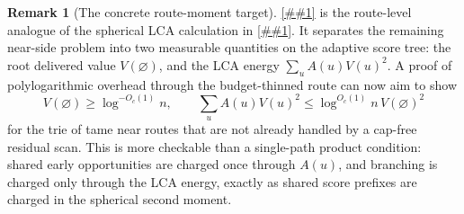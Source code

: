 \documentclass[10pt]{article}
\newcommand{\cref}[1]{\ref{##1}}
\newcommand{\Cref}[1]{\ref{##1}}
\theoremstyle{definition}
\newtheorem{remark}[theorem]{Remark}
\begin{document}
\begin{remark}[The concrete route-moment target]\label{rem:lca-value-target}
   \Cref{lem:lca-value-flow} is the route-level analogue of the spherical LCA
   calculation in \cref{lem:tame-second-moment}. It separates the remaining
   near-side problem into two measurable quantities on the adaptive score tree:
   the root delivered value $V(\varnothing)$, and the LCA energy
   $\sum_uA(u)V(u)^2$. A proof of polylogarithmic overhead through the
   budget-thinned route can now aim to show
   \[
      V(\varnothing)\ge\log^{-O_c(1)}n,
      \qquad
      \sum_uA(u)V(u)^2
      \le \log^{O_c(1)}n\,V(\varnothing)^2
   \]
   for the trie of tame near routes that are not already handled by a cap-free
   residual scan. This is more checkable than a single-path product condition:
   shared early opportunities are charged once through $A(u)$, and branching is
   charged only through the LCA energy, exactly as shared score prefixes are
   charged in the spherical second moment.


\end{remark}
\end{document}
